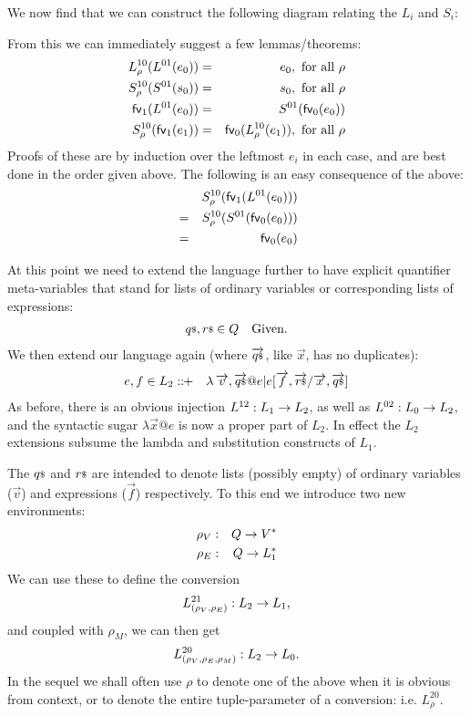 We now find that we can construct the following diagram relating the $L_i$ and $S_i$:
\begin{center}
\end{center}
From this we can immediately suggest a few lemmas/theorems:
\begin{eqnarray}
   L^{10}_\rho(L^{01}(e_0)) &=& e_0, \mbox{ for all }\rho
\\ S^{10}_\rho(S^{01}(s_0)) &=& s_0, \mbox{ for all }\rho
\\ \mathsf{fv}_1(L^{01}(e_0)) &=& S^{01}(\mathsf{fv}_0(e_0))
\\ S^{10}_\rho(\mathsf{fv}_1(e_1)) &=& \mathsf{fv}_0(L^{10}_\rho(e_1)), \mbox{ for all }\rho
\end{eqnarray}
Proofs of these are by induction over the leftmost $e_i$ in each case,
and are best done in the order given above.
The following is an easy consequence of the above:
\begin{eqnarray*}
   && S^{10}_\rho(\mathsf{fv}_1(L^{01}(e_0)))
\\ &=& S^{10}_\rho(S^{01}(\mathsf{fv}_0(e_0)))
\\ &=& \mathsf{fv}_0(e_0)
\end{eqnarray*}

At this point we need to extend the language further to have explicit
quantifier meta-variables that stand for lists of ordinary variables
or corresponding lists of expressions:
\begin{eqnarray*}
  {q}{\scriptstyle\$},{r}{\scriptstyle\$} \in Q && \mbox{Given.}
\end{eqnarray*}
We then extend our language again (where $\overrightarrow{{q}{\scriptstyle\$}}$, like $\vec x$, has no duplicates):
\begin{eqnarray*}
   e,f \in L_2 &::\!\!+& \lambda \vec v,\lstvec q @ e | e[\vec f,\lstvec r/\vec x,\lstvec q]
\end{eqnarray*}
As before, there is an obvious injection $L^{12} : L_1 \rightarrow L_2$,
as well as $L^{02} : L_0 \rightarrow L_2$,
and the syntactic sugar $\lambda \vec x @ e$  is now a proper part of $L_2$.
In effect the $L_2$ extensions subsume the lambda and substitution
constructs of $L_1$.

The ${q}{\scriptstyle\$}$ and ${r}{\scriptstyle\$}$ are intended to denote lists (possibly empty)
of ordinary variables ($\vec v$) and expressions ($\vec f$) respectively.
To this end we introduce two new environments:
\begin{eqnarray*}
   \rho_V &:& Q \rightarrow V^*
\\ \rho_E &:& Q \rightarrow L_1^*
\end{eqnarray*}
We can use these to define the conversion
$$L^{21}_{(\rho_V,\rho_E)} : L_2 \rightarrow L_1,$$
and coupled with $\rho_M$, we can then get
$$L^{20}_{(\rho_V,\rho_E,\rho_M)} : L_2 \rightarrow L_0.$$
In the sequel we shall often use $\rho$ to denote one of the above
when it is  obvious from context,
or to denote the entire tuple-parameter of a conversion: i.e. $L^{20}_\rho$.

